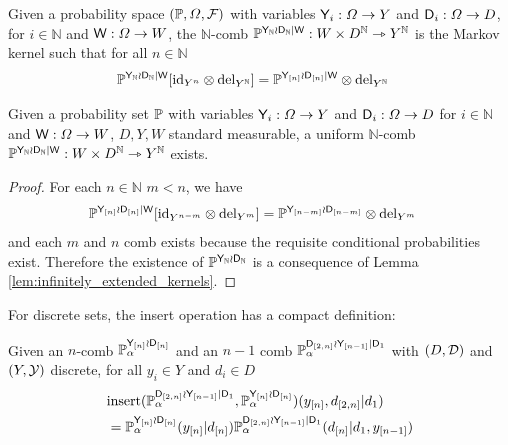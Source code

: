 \begin{definition}
Given a probability space $(\mathbb{P},\Omega,\mathcal{F})$ with variables $\mathsf{Y}_i:\Omega\to Y$ and $\mathsf{D}_i:\Omega\to D$, for $i\in \mathbb{N}$ and $\mathsf{W}:\Omega\to W$, the $\mathbb{N}$-comb $\mathbb{P}^{\mathsf{Y}_{\mathbb{N}}\wr \mathsf{D}_{\mathbb{N}}|\mathsf{W}}:W\times D^\mathbb{N}\rightarrowtriangle Y^\mathbb{N}$ is the Markov kernel such that for all $n\in \mathbb{N}$
\begin{align}
    \mathbb{P}^{\mathsf{Y}_{\mathbb{N}}\wr \mathsf{D}_{\mathbb{N}}|\mathsf{W}}[\mathrm{id}_{Y^{n}}\otimes \mathrm{del}_{Y^{\mathbb{N}}}] &= \mathbb{P}^{\mathsf{Y}_{[n]}\wr \mathsf{D}_{[n]}|\mathsf{W}}\otimes \mathrm{del}_{Y^{\mathbb{N}}}
\end{align}
\end{definition}

\begin{theorem}
Given a probability set $\mathbb{P}$ with variables $\mathsf{Y}_i:\Omega\to Y$ and $\mathsf{D}_i:\Omega\to D$ for $i\in \mathbb{N}$ and $\mathsf{W}:\Omega\to W$, $D,Y,W$ standard measurable, a uniform $\mathbb{N}$-comb $\mathbb{P}^{\mathsf{Y}_{\mathbb{N}}\wr \mathsf{D}_{\mathbb{N}}|\mathsf{W}}:W\times D^\mathbb{N}\rightarrowtriangle Y^\mathbb{N}$ exists.
\end{theorem}

\begin{proof}
For each $n\in \mathbb{N}$ $m<n$, we have
\begin{align}
    \mathbb{P}^{\mathsf{Y}_{[n]}\wr \mathsf{D}_{[n]}|\mathsf{W}}[\mathrm{id}_{Y^{n-m}}\otimes \mathrm{del}_{Y^m}] &= \mathbb{P}^{\mathsf{Y}_{[n-m]}\wr \mathsf{D}_{[n-m]}}\otimes \mathrm{del}_{Y^m}
\end{align}
and each $m$ and $n$ comb exists because the requisite conditional probabilities exist. Therefore the existence of $\mathbb{P}^{\mathsf{Y}_{\mathbb{N}}\wr \mathsf{D}_{\mathbb{N}}}$ is a consequence of Lemma \ref{lem:infinitely_extended_kernels}.
\end{proof}

For discrete sets, the insert operation has a compact definition:

\begin{definition}\label{def:insert_discrete}
Given an $n$-comb $\mathbb{P}_\alpha^{\mathsf{Y}_{[n]}\wr \mathsf{D}_{[n]}}$ and an $n-1$ comb $\mathbb{P}_\alpha^{\mathsf{D}_{[2,n]}\wr \mathsf{Y}_{[n-1]}|\mathsf{D}_1}$ with $(D,\mathcal{D})$ and $(Y,\mathcal{Y})$ discrete, for all $y_i\in Y$ and $d_i\in D$
\begin{align}
    &\mathrm{insert}(\mathbb{P}_\alpha^{\mathsf{D}_{[2,n]}\wr \mathsf{Y}_{[n-1]}|\mathsf{D}_1},\mathbb{P}_\alpha^{\mathsf{Y}_{[n]}\wr \mathsf{D}_{[n]}})(y_{[n]},d_{[2,n]}|d_1)\\
     &= \mathbb{P}_\alpha^{\mathsf{Y}_{[n]}\wr \mathsf{D}_{[n]}}(y_{[n]}|d_{[n]})\mathbb{P}_\alpha^{\mathsf{D}_{[2,n]}\wr \mathsf{Y}_{[n-1]}|\mathsf{D}_1}(d_{[n]}|d_1,y_{[n-1]})
\end{align}
\end{definition}

